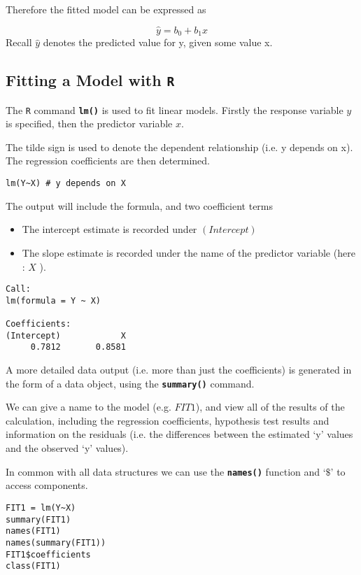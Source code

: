 \documentclass[ModuleBmain.tex]{subfiles}
\begin{document}
Therefore the fitted model can be expressed as

\[ \hat{y} = b_0 + b_1x \]
Recall $\hat{y}$  denotes the predicted value for y, given some value x.

\subsection{Fitting a Model with \texttt{R}}

The  \texttt{R} command   \texttt{\textbf{lm()}} is used to fit linear models. Firstly the response variable $y$  is specified, then the predictor variable $x$.

The tilde sign is used to denote the dependent relationship (i.e. y depends on x). The regression coefficients are then determined.

\begin{framed}
\begin{verbatim}
lm(Y~X) # y depends on X
\end{verbatim}
\end{framed}

The output will include the formula, and two coefficient terms
\begin{itemize}
\item The intercept estimate is recorded under $(Intercept)$
\item The slope estimate is recorded under the name of the predictor variable (here : $X$ ).
\end{itemize}	
	
\begin{verbatim}
Call:
lm(formula = Y ~ X)

Coefficients:
(Intercept)            X
     0.7812       0.8581
\end{verbatim}

A more detailed data output (i.e. more than just the coefficients) is generated in the form of a data object, using the \textbf{\texttt{summary()}} command.

We can give a name to the model (e.g. $FIT1$), and view all of the results of the calculation, including the regression coefficients, hypothesis test results and information on the residuals (i.e. the differences between the estimated ‘y’ values and the observed ‘y’ values).

In common with all data structures we can use the \textbf{\texttt{names()}} function and ‘$\$$’ to access components.

\begin{framed}
\begin{verbatim}
FIT1 = lm(Y~X)
summary(FIT1)
names(FIT1)
names(summary(FIT1))
FIT1$coefficients
class(FIT1)
\end{verbatim}
\end{framed}
\newpage
\end{document}
